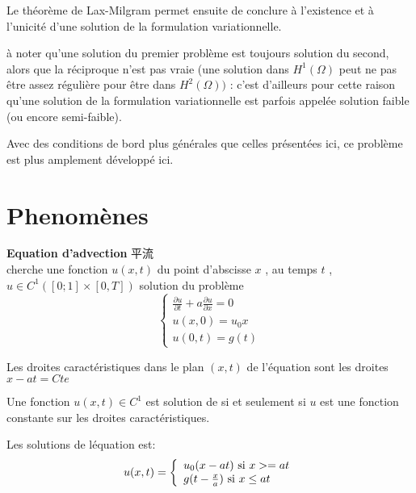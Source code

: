 \documentclass[openany]{book}
\begin{document}
Le th\'eor\`eme de Lax-Milgram permet ensuite de conclure \`a l'existence et \`a l'unicit\'e d'une solution de la formulation variationnelle.

\`a noter qu'une solution du premier probl\`eme est toujours solution du second, alors que la r\'eciproque n'est pas vraie (une solution dans $  H^1(\Omega)$   peut ne pas \^etre assez r\'eguli\`ere pour \^etre dans $  H^2(\Omega)) $  : c'est d'ailleurs pour cette raison qu'une solution de la formulation variationnelle est parfois appel\'ee solution faible (ou encore semi-faible).

Avec des conditions de bord plus g\'en\'erales que celles pr\'esent\'ees ici, ce probl\`eme est plus amplement d\'evelopp\'e ici.

\section{Phenom\`enes}
\textbf{Equation d'advection}
平流\\
cherche une fonction $u(x,t)$ du point d'abscisse $ x$ , au temps $ t$ , $ u \in C^1([0;1] \times [0,T])$ solution du probl\`eme
\begin{equation}
\left\{
  \begin{array}{ll}
		  \frac{\partial  u}{\partial t} + a \frac{\partial u}{\partial x } = 0 \\
		  u(x,0) = u_0{x} \\
		  u(0,t) = g(t)
  \end{array}
\right.
\end{equation}
\begin{definition}
		Les droites caract\'eristiques dans le plan $(x,t)$ de l'\'equation \lasteq  sont les droites$
x - at = Cte$
\end{definition}

\begin{proposition}
		Une fonction $ u(x,t) \in C^1$  est solution de \lasteq  si et seulement si $ u$  est une
fonction constante sur les droites caract\'eristiques.
\end{proposition}

Les solutions de l\'equation \lasteq est:
\begin{equation}
u(x,t)=
\left\{
  \begin{array}{ll}
		  u_0(x-at) \textrm{ si } x >= at \\
		  g(t-\frac{x}{a}) \textrm{ si } x \leq at
  \end{array}
\right.
\end{equation}
\bigskip
\end{document}
